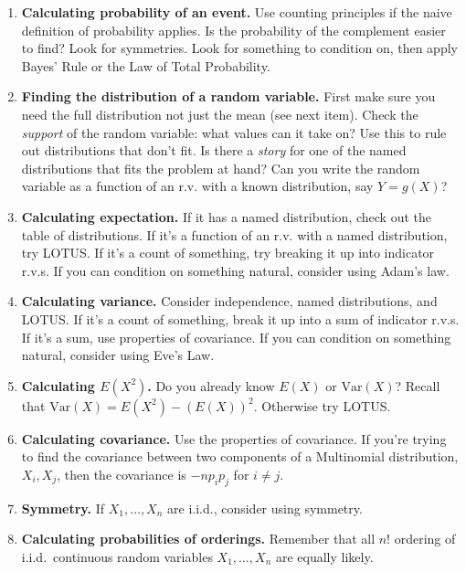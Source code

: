 \documentclass[10pt,landscape]{article}
\newcommand{\var}{\textrm{Var}}
\begin{document}
\begin{multicols*}{3}
\begin{enumerate}
        \item \textbf{Calculating probability of an event.} Use counting principles if the naive definition of probability applies. Is the probability of the complement easier to find? Look for symmetries. Look for something to condition on, then apply Bayes' Rule or the Law of Total Probability. 
        
        \item \textbf{Finding the distribution of a random variable.} First make sure you need the full distribution not just the mean (see next item). Check the \emph{support} of the random variable: what values can it take on? Use this to rule out distributions that don't fit.  Is there a     \emph{story} for one of the named distributions that fits the problem at hand?  Can you write the random variable as a function of an r.v. with a known distribution, say $Y = g(X)$?
        
        \item \textbf{Calculating expectation.} If it has a named distribution, check out the table of distributions. If it's a function of an r.v. with a named distribution, try LOTUS. If it's a count of something, try breaking it up into indicator r.v.s. If you can condition on something natural, consider using Adam's law. 
        
        \item \textbf{Calculating variance.} Consider independence, named distributions, and LOTUS. If it's a count of something, break it up into a sum of indicator r.v.s. If it's a sum, use properties of covariance. If you can condition on something natural, consider using Eve's Law.
        
        \item \textbf{Calculating $E(X^2)$.}  Do you already know $E(X)$ or $\var(X)$? Recall that $\var(X) = E(X^2) - (E(X))^2$. Otherwise try LOTUS.
        
        \item \textbf{Calculating covariance.} Use the properties of covariance. If you're trying to find the covariance between two components of a Multinomial distribution, $X_i, X_j$, then the covariance is $-np_ip_j$ for $i \neq j$.
        
        \item \textbf{Symmetry.} If $X_1,\dots,X_n$ are i.i.d., consider using symmetry.
        
        \item \textbf{Calculating probabilities of orderings.} Remember that all $n!$ ordering of i.i.d.~continuous random variables $X_1,\dots,X_n$ are equally likely.
        

\end{enumerate}
\end{multicols*}
\end{document}
